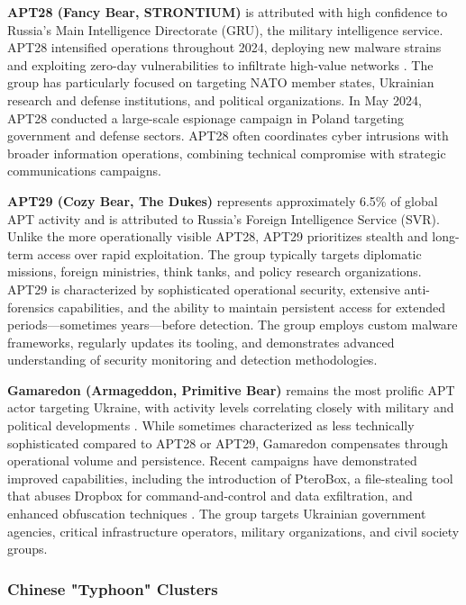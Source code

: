 \textbf{APT28 (Fancy Bear, STRONTIUM)} is attributed with high confidence to Russia's Main Intelligence Directorate (GRU), the military intelligence service. APT28 intensified operations throughout 2024, deploying new malware strains and exploiting zero-day vulnerabilities to infiltrate high-value networks \cite{socradar2024}. The group has particularly focused on targeting NATO member states, Ukrainian research and defense institutions, and political organizations. In May 2024, APT28 conducted a large-scale espionage campaign in Poland targeting government and defense sectors. APT28 often coordinates cyber intrusions with broader information operations, combining technical compromise with strategic communications campaigns.

\textbf{APT29 (Cozy Bear, The Dukes)} represents approximately 6.5\% of global APT activity \cite{trellix2025} and is attributed to Russia's Foreign Intelligence Service (SVR). Unlike the more operationally visible APT28, APT29 prioritizes stealth and long-term access over rapid exploitation. The group typically targets diplomatic missions, foreign ministries, think tanks, and policy research organizations. APT29 is characterized by sophisticated operational security, extensive anti-forensics capabilities, and the ability to maintain persistent access for extended periods—sometimes years—before detection. The group employs custom malware frameworks, regularly updates its tooling, and demonstrates advanced understanding of security monitoring and detection methodologies.

\textbf{Gamaredon (Armageddon, Primitive Bear)} remains the most prolific APT actor targeting Ukraine, with activity levels correlating closely with military and political developments \cite{eset2025}. While sometimes characterized as less technically sophisticated compared to APT28 or APT29, Gamaredon compensates through operational volume and persistence. Recent campaigns have demonstrated improved capabilities, including the introduction of PteroBox, a file-stealing tool that abuses Dropbox for command-and-control and data exfiltration, and enhanced obfuscation techniques \cite{eset2025}. The group targets Ukrainian government agencies, critical infrastructure operators, military organizations, and civil society groups.

\subsubsection{Chinese "Typhoon" Clusters}

